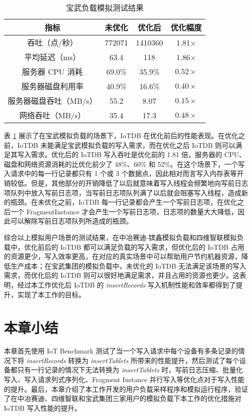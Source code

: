 \begin{table}
  \centering
  \caption{宝武负载模拟测试结果}
  \begin{tabular}{cccc}
    \toprule 
    指标 &  未优化  & 优化后 & 优化幅度 \\
    \midrule
    吞吐（点/秒） & 772071 & 	1410360 & 1.81$\times$\\
    平均延迟（ms） & 63.4 & 	118 & 1.86$\times$\\
    服务器 CPU 消耗 & 69.0\% & 	35.9\% & $0.52\times$\\
    服务器磁盘利用率 & 40.9\% & 	16.6\% & $0.40\times$\\
    服务器磁盘吞吐（MB/s） & 55.2 & 8.07 & $0.15\times$ \\
    网络吞吐（MB/s） & 35.4 & 	17.3 & $0.48\times$\\
    \bottomrule
  \end{tabular}
  \label{tabular:bw-performance}
\end{table}
表 \ref{tabular:bw-performance} 展示了在宝武模拟负载的场景下，IoTDB 在优化前后的性能表现。在优化之前，IoTDB 未能满足宝武模拟负载的写入需求，而在优化之后 IoTDB 则可以满足其写入需求。优化后的 IoTDB 写入吞吐是优化前的 1.81 倍，服务器的 CPU、磁盘和网络资源消耗的比优化前少了 48\%、60\% 和 52\%。在这个场景下，一个写入请求中的每一行记录都只有 1 个或 3 个数据点，因此相对而言写入内存表等开销较低。但是，其他部分的开销降低了以后就意味着写入线程会频繁地向写前日志项队列中放入写前日志项，当写前日志项队列满了以后就会阻塞写入线程，造成新的瓶颈。在未优化之前，IoTDB 每一行记录都会产生一个写前日志项，在优化之后一个 FragmentInstance 才会产生一个写前日志项，日志项的数量大大降低，因此可以解除写前日志项队列所造成的瓶颈。

综合以上模拟用户场景的测试结果，在中冶赛迪-镔鑫模拟负载和四维智联模拟负载中，优化前后的 IoTDB 都可以满足负载的写入需求，但优化后的 IoTDB 占用的资源更少，写入效率更高，在对应的真实场景中可以帮助用户节约机器资源，降低生产成本；在宝武集团的模拟负载中，未优化的 IoTDB 无法满足该场景的写入需求，而优化后的 IoTDB 则可以很好地满足需求，并且占用的资源也更少。这表明，经过本工作优化后 IoTDB 的 \emph{insertRecords} 写入机制性能和效率都得到了提升，实现了本工作的目标。
\section{本章小结}
本章首先使用 IoT Benchmark 测试了当一个写入请求中每个设备有多条记录的情况下将 \emph{insertRecords} 转换为 \emph{insertTablets} 所带来的性能提升，然后测试了每个设备都只有一行记录的情况下无法转换为 \emph{insertTablets} 时，写前日志压缩、批量化写入、写入请求列式序列化、Fragment Instance 并行写入等优化点对于写入性能的提升。最后，本章介绍了本工作开发的用户负载采样程序和模拟运行程序，验证了在中冶赛迪、四维智联和宝武集团三家用户的模拟负载下本工作的优化措施对 IoTDB 写入性能的提升。